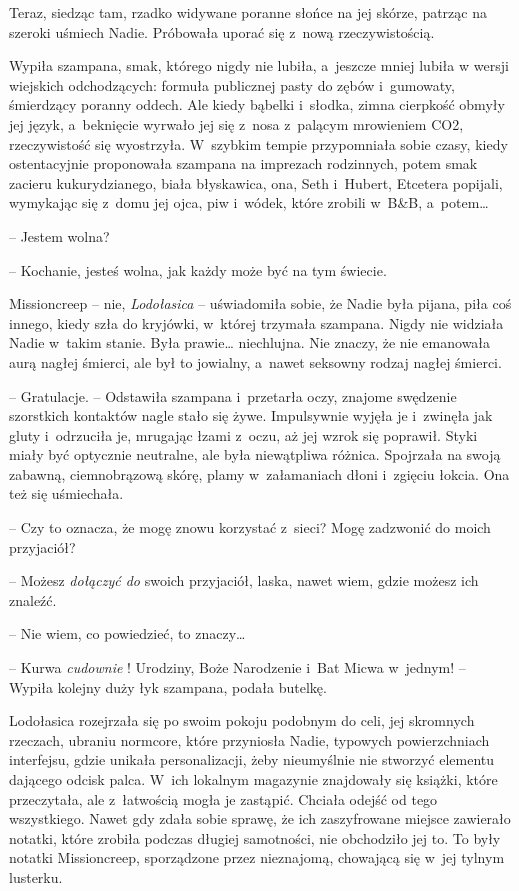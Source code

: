 \documentclass[oneside,polish,11pt,sfheadings]{mwbk}
\begin{document}
Teraz, siedząc tam, rzadko widywane poranne słońce na jej skórze,
patrząc na szeroki uśmiech Nadie. Próbowała uporać się z~nową
rzeczywistością.

Wypiła szampana, smak, którego nigdy nie lubiła, a~jeszcze mniej lubiła
w wersji wiejskich odchodzących: formuła publicznej pasty do zębów i~gumowaty, śmierdzący poranny oddech. Ale kiedy bąbelki i~słodka, zimna
cierpkość obmyły jej język, a~beknięcie wyrwało jej się z~nosa z~palącym
mrowieniem CO2, rzeczywistość się wyostrzyła. W~szybkim tempie
przypomniała sobie czasy, kiedy ostentacyjnie proponowała szampana na
imprezach rodzinnych, potem smak zacieru kukurydzianego, biała
błyskawica, ona, Seth i~Hubert, Etcetera popijali, wymykając się z~domu
jej ojca, piw i~wódek, które zrobili w~B\&B, a~potem\ldots 

-- Jestem wolna?

-- Kochanie, jesteś wolna, jak każdy może być na tym świecie.

Missioncreep -- nie, \textit{Lodołasica} -- uświadomiła sobie, że Nadie była
pijana, piła coś innego, kiedy szła do kryjówki, w~której trzymała
szampana. Nigdy nie widziała Nadie w~takim stanie. Była prawie\ldots 
niechlujna. Nie znaczy, że nie emanowała aurą nagłej śmierci, ale był to
jowialny, a~nawet seksowny rodzaj nagłej śmierci.

-- Gratulacje. -- Odstawiła szampana i~przetarła oczy, znajome swędzenie
szorstkich kontaktów nagle stało się żywe. Impulsywnie wyjęła je i~zwinęła jak gluty i~odrzuciła je, mrugając łzami z~oczu, aż jej wzrok
się poprawił. Styki miały być optycznie neutralne, ale była niewątpliwa
różnica. Spojrzała na swoją zabawną, ciemnobrązową skórę, plamy w~załamaniach dłoni i~zgięciu łokcia. Ona też się uśmiechała.

-- Czy to oznacza, że mogę znowu korzystać z~sieci? Mogę zadzwonić do
moich przyjaciół?

-- Możesz \textit{dołączyć do }swoich przyjaciół, laska, nawet wiem, gdzie
możesz ich znaleźć.

-- Nie wiem, co powiedzieć, to znaczy\ldots 

-- Kurwa \textit{cudownie }! Urodziny, Boże Narodzenie i~Bat Micwa w~jednym! -- Wypiła kolejny duży łyk szampana, podała butelkę.

Lodołasica rozejrzała się po swoim pokoju podobnym do celi, jej
skromnych rzeczach, ubraniu normcore, które przyniosła Nadie, typowych
powierzchniach interfejsu, gdzie unikała personalizacji, żeby
nieumyślnie nie stworzyć elementu dającego odcisk palca. W~ich lokalnym
magazynie znajdowały się książki, które przeczytała, ale z~łatwością
mogła je zastąpić. Chciała odejść od tego wszystkiego. Nawet gdy zdała
sobie sprawę, że ich zaszyfrowane miejsce zawierało notatki, które
zrobiła podczas długiej samotności, nie obchodziło jej to. To były
notatki Missioncreep, sporządzone przez nieznajomą, chowającą się w~jej
tylnym lusterku.
\end{document}
